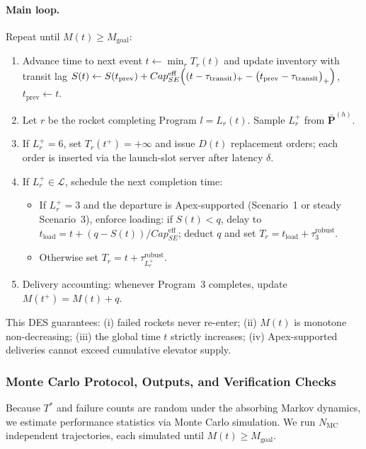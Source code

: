 ﻿\documentclass{mcmthesis}
\begin{document}
\paragraph{Main loop.}
Repeat until $M(t)\ge M_{\text{goal}}$:
\begin{enumerate}
\item Advance time to next event $t\leftarrow \min_r T_r(t)$ and update inventory with transit lag
$S(t)\leftarrow S(t_{\text{prev}})+Cap_{SE}^{\text{eff}}\Bigl((t-\tau_{\text{transit}})_+-\bigl(t_{\text{prev}}-\tau_{\text{transit}}\bigr)_+\Bigr)$, $t_{\text{prev}}\leftarrow t$.
\item Let $r$ be the rocket completing Program $l=L_r(t)$. Sample $L_r^+$ from $\bar{\mathbf P}^{(h)}$.
\item If $L_r^+=6$, set $T_r(t^+)=+\infty$ and issue $D(t)$ replacement orders; each order is inserted via the
launch-slot server after latency $\delta$.
\item If $L_r^+\in\mathcal{L}$, schedule the next completion time:
\begin{itemize}
\item If $L_r^+=3$ and the departure is Apex-supported (Scenario~1 or steady Scenario~3), enforce loading:
if $S(t)<q$, delay to $t_{\text{load}}=t+(q-S(t))/Cap_{SE}^{\text{eff}}$; deduct $q$ and set
$T_r=t_{\text{load}}+\tau_3^{\text{robust}}$.
\item Otherwise set $T_r=t+\tau_{L_r^+}^{\text{robust}}$.
\end{itemize}
\item Delivery accounting: whenever Program~3 completes, update $M(t^+)=M(t)+q$.
\end{enumerate}

\noindent
This DES guarantees: (i) failed rockets never re-enter; (ii) $M(t)$ is monotone non-decreasing;
(iii) the global time $t$ strictly increases; (iv) Apex-supported deliveries cannot exceed cumulative elevator supply.

\subsubsection{Monte Carlo Protocol, Outputs, and Verification Checks}
\label{sec:model2_mc}

Because $T^{*}$ and failure counts are random under the absorbing Markov dynamics, we estimate performance
statistics via Monte Carlo simulation. We run $N_{\text{MC}}$ independent trajectories, each simulated until
$M(t)\ge M_{\text{goal}}$.
\end{document}
